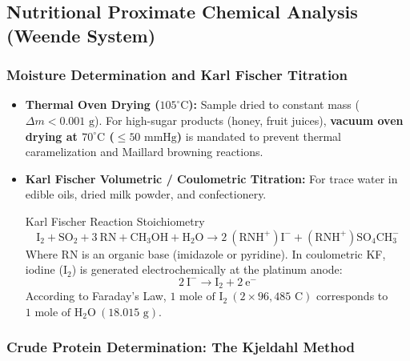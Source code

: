 \documentclass[11pt,a4paper,oneside]{article}
\begin{document}
\subsection{Nutritional Proximate Chemical Analysis (Weende System)}

\subsubsection{Moisture Determination and Karl Fischer Titration}
\begin{itemize}[leftmargin=*]
    \item \textbf{Thermal Oven Drying ($105^\circ\text{C}$):} Sample dried to constant mass ($\Delta m < 0.001\text{ g}$). For high-sugar products (honey, fruit juices), \textbf{vacuum oven drying at $70^\circ\text{C}$ ($\le 50\text{ mmHg}$)} is mandated to prevent thermal caramelization and Maillard browning reactions.
    \item \textbf{Karl Fischer Volumetric / Coulometric Titration:} For trace water in edible oils, dried milk powder, and confectionery.
    \begin{formulabox}{Karl Fischer Reaction Stoichiometry}
    $$\mathrm{I_2 + SO_2 + 3\ RN + CH_3OH + H_2O \longrightarrow 2\ (RNH^+)I^- + (RNH^+)SO_4CH_3^-}$$
    Where $\mathrm{RN}$ is an organic base (imidazole or pyridine). In coulometric KF, iodine ($\mathrm{I_2}$) is generated electrochemically at the platinum anode:
    $$2\ \mathrm{I^- \longrightarrow I_2 + 2\ e^-}$$
    According to Faraday's Law, $1\text{ mole of }\mathrm{I_2}\ (2\times 96{,}485\text{ C})$ corresponds to $1\text{ mole of }\mathrm{H_2O}\ (18.015\text{ g})$.
    \end{formulabox}
\end{itemize}

\subsubsection{Crude Protein Determination: The Kjeldahl Method}
\end{document}
